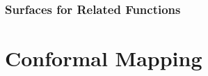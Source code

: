 \documentclass[12pt, english]{book}
\begin{document}
	

	
	\subsection{Surfaces for Related Functions} \label{Surfaces for Related Functions Subsection - Complex}
	
	
	
	
	
	
	
	
	
	
	
	
	
	
	
	
	
	
	
	
	
	
	
	
	
	
	
	
	
	
	
	
	
	
	
	
	
	
	
	
	
	
	
	
	
	
	
	
	
	
	
	
	
	
	
	
	
	
	
	
	
	
	
	
	
	
	
	
	
	
	
	
	
	
	
	
	
	
	
	
	
	
	
	
	
	
	
	
	
	
	
	
	
	
	
	
	
	
	
	\chapter{Conformal Mapping} \label{Conformal Mapping Chapter - Complex}
	
\end{document}
